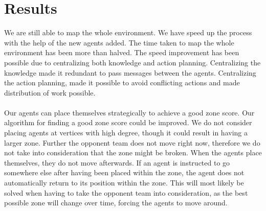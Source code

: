 \documentclass[11pt]{report}
\begin{document}
\section*{Results}
We are still able to map the whole environment. We have speed up the process with the help of the new agents added. The time taken to map the whole environment has been more than halved. The speed improvement has been possible due to centralizing both knowledge and action planning. Centralizing the knowledge made it redundant to pass messages between the agents. Centralizing the action planning, made it possible to avoid conflicting actions and made distribution of work possible.\\
\\
Our agents can place themselves strategically to achieve a good zone score. Our algorithm for finding a good zone score could be improved. We do not consider placing agents at vertices with high degree, though it could result in having a larger zone. Further the opponent team does not move right now, therefore we do not take into consideration that the zone might be broken. When the agents place themselves, they do not move afterwards. If an agent is instructed to go somewhere else after having been placed within the zone, the agent does not automatically return to its position within the zone. This will most likely be solved when having to take the opponent team into consideration, as the best possible zone will change over time, forcing the agents to move around.
\end{document}
